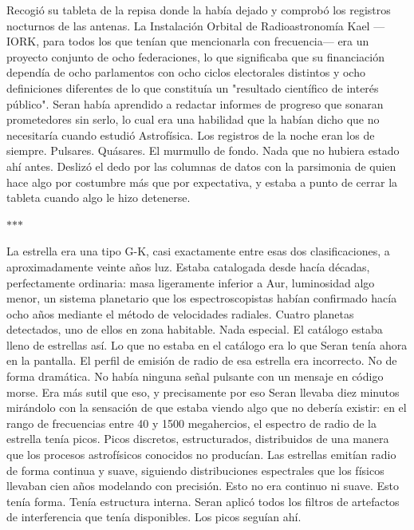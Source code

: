 \documentclass[11pt,a5paper,twoside]{book}
\begin{document}
Recogió su tableta de la repisa donde la había dejado y comprobó los registros nocturnos de las antenas. La Instalación Orbital de Radioastronomía Kael —IORK, para todos los que tenían que mencionarla con frecuencia— era un proyecto conjunto de ocho federaciones, lo que significaba que su financiación dependía de ocho parlamentos con ocho ciclos electorales distintos y ocho definiciones diferentes de lo que constituía un "resultado científico de interés público". Seran había aprendido a redactar informes de progreso que sonaran prometedores sin serlo, lo cual era una habilidad que la habían dicho que no necesitaría cuando estudió Astrofísica.
Los registros de la noche eran los de siempre. Pulsares. Quásares. El murmullo de fondo. Nada que no hubiera estado ahí antes.
Deslizó el dedo por las columnas de datos con la parsimonia de quien hace algo por costumbre más que por expectativa, y estaba a punto de cerrar la tableta cuando algo le hizo detenerse.
\vspace{1.5em}
\begin{center}$\ast$\quad$\ast$\quad$\ast$\end{center}
\vspace{1.5em}
La estrella era una tipo G-K, casi exactamente entre esas dos clasificaciones, a aproximadamente veinte años luz. Estaba catalogada desde hacía décadas, perfectamente ordinaria: masa ligeramente inferior a Aur, luminosidad algo menor, un sistema planetario que los espectroscopistas habían confirmado hacía ocho años mediante el método de velocidades radiales. Cuatro planetas detectados, uno de ellos en zona habitable. Nada especial. El catálogo estaba lleno de estrellas así.
Lo que no estaba en el catálogo era lo que Seran tenía ahora en la pantalla.
El perfil de emisión de radio de esa estrella era incorrecto.
No de forma dramática. No había ninguna señal pulsante con un mensaje en código morse. Era más sutil que eso, y precisamente por eso Seran llevaba diez minutos mirándolo con la sensación de que estaba viendo algo que no debería existir: en el rango de frecuencias entre 40 y 1500 megahercios, el espectro de radio de la estrella tenía picos. Picos discretos, estructurados, distribuidos de una manera que los procesos astrofísicos conocidos no producían. Las estrellas emitían radio de forma continua y suave, siguiendo distribuciones espectrales que los físicos llevaban cien años modelando con precisión. Esto no era continuo ni suave. Esto tenía forma. Tenía estructura interna.
Seran aplicó todos los filtros de artefactos de interferencia que tenía disponibles. Los picos seguían ahí.
\end{document}
